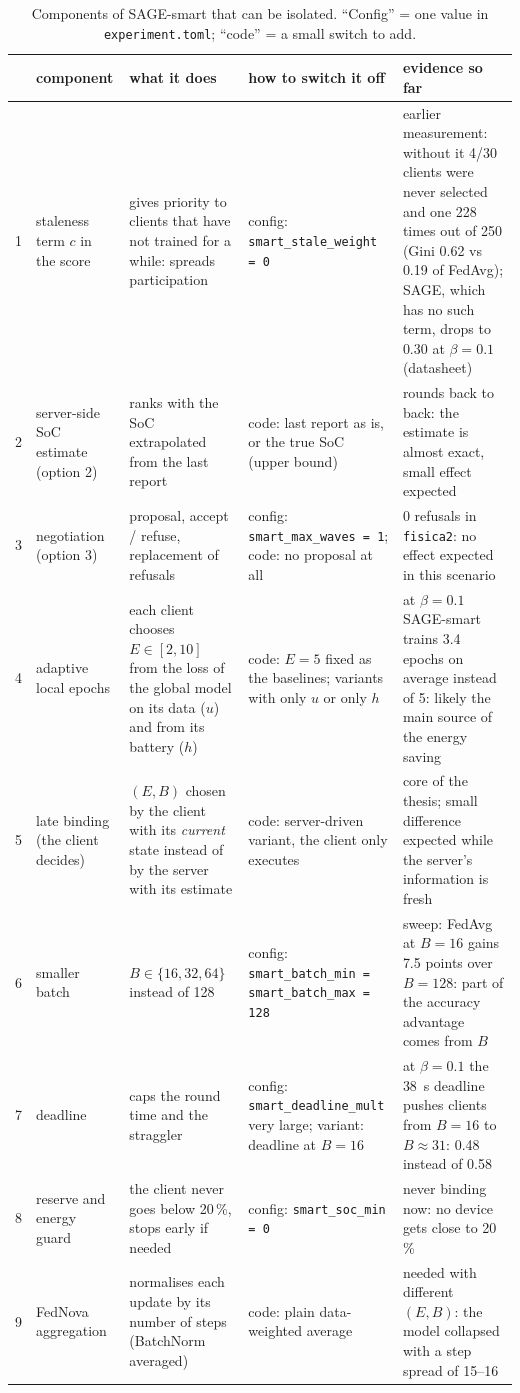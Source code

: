 \documentclass[11pt,a4paper]{article}
\begin{document}
\begin{table}[H]
\centering
\small
\caption{Components of SAGE-smart that can be isolated. ``Config'' = one
value in \texttt{experiment.toml}; ``code'' = a small switch to add.}
\label{tab:ablations}
\begin{tabular}{p{0.3cm}p{3.1cm}p{4.2cm}p{3.0cm}p{4.0cm}}
\toprule
& component & what it does & how to switch it off & evidence so far \\
\midrule
1 & staleness term $c$ in the score & gives priority to clients that have not trained for a while: spreads participation & config: \texttt{smart\_stale\_weight = 0} & earlier measurement: without it 4/30 clients were never selected and one 228 times out of 250 (Gini 0.62 vs 0.19 of FedAvg); SAGE, which has no such term, drops to 0.30 at $\beta=0.1$ (datasheet) \\
2 & server-side SoC estimate (option 2) & ranks with the SoC extrapolated from the last report & code: last report as is, or the true SoC (upper bound) & rounds back to back: the estimate is almost exact, small effect expected \\
3 & negotiation (option 3) & proposal, accept / refuse, replacement of refusals & config: \texttt{smart\_max\_waves = 1}; code: no proposal at all & 0 refusals in \texttt{fisica2}: no effect expected in this scenario \\
4 & adaptive local epochs & each client chooses $E\in[2,10]$ from the loss of the global model on its data ($u$) and from its battery ($h$) & code: $E=5$ fixed as the baselines; variants with only $u$ or only $h$ & at $\beta=0.1$ SAGE-smart trains 3.4 epochs on average instead of 5: likely the main source of the energy saving \\
5 & late binding (the client decides) & $(E,B)$ chosen by the client with its \emph{current} state instead of by the server with its estimate & code: server-driven variant, the client only executes & core of the thesis; small difference expected while the server's information is fresh \\
6 & smaller batch & $B\in\{16,32,64\}$ instead of 128 & config: \texttt{smart\_batch\_min = smart\_batch\_max = 128} & sweep: FedAvg at $B=16$ gains 7.5 points over $B=128$: part of the accuracy advantage comes from $B$ \\
7 & deadline & caps the round time and the straggler & config: \texttt{smart\_deadline\_mult} very large; variant: deadline at $B=16$ & at $\beta=0.1$ the 38~s deadline pushes clients from $B=16$ to $B\approx 31$: 0.48 instead of 0.58 \\
8 & reserve and energy guard & the client never goes below 20\,\%, stops early if needed & config: \texttt{smart\_soc\_min = 0} & never binding now: no device gets close to 20\,\% \\
9 & FedNova aggregation & normalises each update by its number of steps (BatchNorm averaged) & code: plain data-weighted average & needed with different $(E,B)$: the model collapsed with a step spread of 15--16 \\
\bottomrule
\end{tabular}
\end{table}
\end{document}
